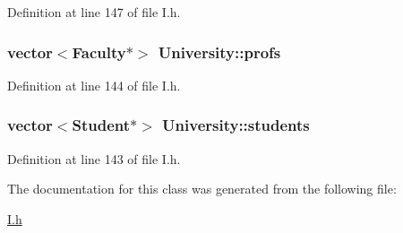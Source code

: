 \-Definition at line 147 of file \-I.\-h.

\hypertarget{classUniversity_a545e0ef08e2af089af1b21173a0fa3ca}{
\subsubsection[{profs}]{\setlength{\rightskip}{0pt plus 5cm}vector$<${\bf \-Faculty}$\ast$$>$ {\bf \-University\-::profs}}}\label{classUniversity_a545e0ef08e2af089af1b21173a0fa3ca}


\-Definition at line 144 of file \-I.\-h.

\hypertarget{classUniversity_a40849f11020c803a8b76241a2931cdcc}{
\subsubsection[{students}]{\setlength{\rightskip}{0pt plus 5cm}vector$<${\bf \-Student}$\ast$$>$ {\bf \-University\-::students}}}\label{classUniversity_a40849f11020c803a8b76241a2931cdcc}


\-Definition at line 143 of file \-I.\-h.



\-The documentation for this class was generated from the following file\-:\begin{DoxyCompactItemize}
\item 
\hyperlink{I_8h}{\-I.\-h}\end{DoxyCompactItemize}
